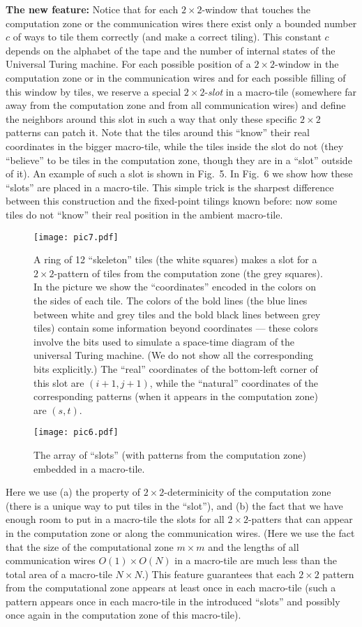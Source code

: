 \documentclass[runningheads]{llncs}
\begin{document}
\textbf{The new feature:} Notice that for each $2\times2$-window that touches the computation zone or the communication wires there exist only a bounded number $c$ of ways to tile them correctly (and make a correct tiling). This constant $c$  depends on the alphabet of the tape and the number of internal states of the Universal Turing machine. For each possible position of a $2\times2$-window in the computation zone or in the communication wires and for each possible filling of this window by tiles, we reserve a special $2\times2$-\emph{slot} in a macro-tile (somewhere far away from the computation zone and from all communication wires) and define the neighbors around this slot in such a way that only these specific $2\times 2$ patterns can patch it.  Note that the tiles around this  ``know'' their real coordinates in the bigger macro-tile, while the tiles inside the slot do not (they ``believe'' to be tiles in the computation zone, though they are in a ``slot'' outside of it). An example of such a slot is shown in Fig.~5. In Fig.~6 we show how these ``slots'' are placed in a macro-tile. This simple trick is the sharpest difference between this construction and the fixed-point tilings known before: now some tiles do  not ``know'' their real position in the ambient macro-tile.  
\begin{figure}
\centering
\texttt{[image: pic7.pdf]}
\label{pic5}
\caption{A ring of 12 ``skeleton'' tiles (the white squares) makes a slot for a $2\times 2$-pattern of tiles from the computation zone (the grey squares). In the picture we show the ``coordinates'' encoded in the colors on the sides of each tile. 
The colors of the bold lines (the blue lines between white and grey tiles and the bold black lines between grey tiles) contain some information beyond coordinates --- these colors involve the bits used to simulate a space-time diagram of the universal Turing machine. (We do not show all the corresponding bits explicitly.) 
The ``real'' coordinates of the bottom-left corner of this slot are $(i+1,j+1)$, while the ``natural'' coordinates of the corresponding patterns (when it appears in the computation zone) are $(s,t)$. 
}
\end{figure}
\begin{figure}
\centering
\texttt{[image: pic6.pdf]}
\label{pic6}
\caption{The array of ``slots'' (with patterns from the computation zone) embedded in a macro-tile.}
\end{figure}

Here we use (a) the property of  $2\times2$-determinicity of the computation zone (there is a unique way to put tiles in the ``slot''), and (b) the fact that we have enough room to put in a macro-tile the slots for all $2\times 2$-patters that can appear in the computation zone or along the communication wires. (Here we use the fact that the size of the computational zone $m\times m$ and the lengths of all communication wires $O(1)\times O(N)$ in a macro-tile are much less than the total area of a macro-tile  $N\times N$.) This feature guarantees that each $2\times2$ pattern from the computational zone appears at least once in each macro-tile (such a pattern appears once in each macro-tile  in the introduced ``slots'' and possibly once again in the computation zone of this macro-tile).
\end{document}
